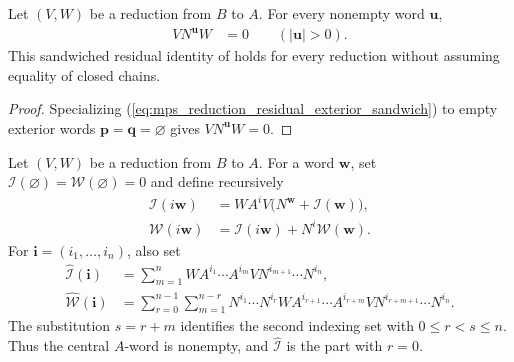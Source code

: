 \begin{lemma}
    \label{thm:mps_reduction_residual_sandwich}
    \leanok
    Let $(V,W)$ be a reduction from $B$ to $A$.  For every nonempty word
    $\mathbf u$,
    \begin{align}
        VN^{\mathbf u}W & =0
        \qquad (|\mathbf u|>0).
        \label{eq:mps_reduction_residual_sandwich}
    \end{align}
    This sandwiched residual identity of \cite{Molnar2018SemiInjective} holds
    for every reduction without assuming equality of closed chains.
\end{lemma}

\begin{proof}
    \leanok
    Specializing (\ref{eq:mps_reduction_residual_exterior_sandwich}) to empty
    exterior words $\mathbf p=\mathbf q=\varnothing$ gives $VN^{\mathbf u}W=0$.
\end{proof}

\begin{definition}
    \label{def:mps_reduction_strict_window_sums}
    \leanok
    Let $(V,W)$ be a reduction from $B$ to $A$.  For a word $\mathbf w$, set
    $\mathcal I(\varnothing)=\mathcal W(\varnothing)=0$ and define
    recursively
    \begin{align}
        \mathcal I(i\mathbf w)
         & =WA^iV\bigl(N^{\mathbf w}+\mathcal I(\mathbf w)\bigr),
        \label{eq:mps_reduction_initial_window_recursion}         \\
        \mathcal W(i\mathbf w)
         & =\mathcal I(i\mathbf w)+N^i\mathcal W(\mathbf w).
        \label{eq:mps_reduction_strict_window_recursion}
    \end{align}
    For $\mathbf i=(i_1,\ldots,i_n)$, also set
    \begin{align}
        \widehat{\mathcal I}(\mathbf i)
         & =\sum_{m=1}^{n}
        W A^{i_1}\cdots A^{i_m}V
        N^{i_{m+1}}\cdots N^{i_n},           \\
        \widehat{\mathcal W}(\mathbf i)
         & =\sum_{r=0}^{n-1}\sum_{m=1}^{n-r}
        N^{i_1}\cdots N^{i_r}
        W A^{i_{r+1}}\cdots A^{i_{r+m}}V
        N^{i_{r+m+1}}\cdots N^{i_n}.
        \label{eq:mps_reduction_strict_window_sum}
    \end{align}
    The substitution $s=r+m$ identifies the second indexing set with
    $0\leq r<s\leq n$.  Thus the central $A$-word is nonempty, and
    $\widehat{\mathcal I}$ is the part with $r=0$.
\end{definition}

